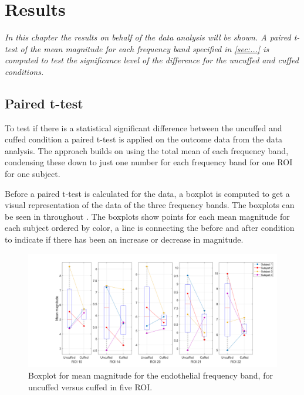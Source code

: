 \chapter{Results}
\textit{In this chapter the results on behalf of the data analysis will be shown. A paired t-test of the mean magnitude for each frequency band specified in \ref{sec:...} is computed to test the significance level of the difference for the uncuffed and cuffed conditions.}

\section{Paired t-test}
To test if there is a statistical significant difference between the uncuffed and cuffed condition a paired t-test is applied on the outcome data from the data analysis. The approach builds on using the total mean of each frequency band, condensing these down to just one number for each frequency band for one ROI for one subject. 

Before a paired t-test is calculated for the data, a boxplot is computed to get a visual representation of the data of the three frequency bands. The boxplots can be seen in  throughout . The boxplots show points for each mean magnitude for each subject ordered by color, a line is connecting the before and after condition to indicate if there has been an increase or decrease in magnitude. 

\begin{figure}[H]
	\includegraphics[width=1\textwidth]{figures/boxplot_endo}
	\caption{Boxplot for mean magnitude for the endothelial frequency band, for uncuffed versus cuffed in five ROI.}
	\label{fig:boxEndo}
\end{figure}

